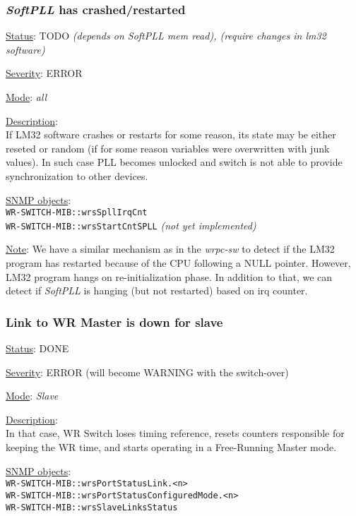 \subsubsection{\bf \emph{SoftPLL} has crashed/restarted}
		\label{fail:timing:spll_crash}
		\begin{packed_enum}
			\item [] \underline{Status}: TODO \emph{(depends on SoftPLL mem read), (require changes in lm32 software)}
			\item [] \underline{Severity}: ERROR
			\item [] \underline{Mode}: \emph{all}
			\item [] \underline{Description}:\\
				If LM32 software crashes or restarts for some reason, its state may be
				either reseted or random (if for some reason variables were overwritten
				with junk values). In such case PLL becomes unlocked and switch is not
				able to provide synchronization to other devices.
			\item [] \underline{SNMP objects}:\\
				\texttt{WR-SWITCH-MIB::wrsSpllIrqCnt}\\
				\texttt{WR-SWITCH-MIB::wrsStartCntSPLL} \emph{(not yet implemented)}
			\item [] \underline{Note}: We have a similar mechanism as in the
				\emph{wrpc-sw} to detect if the LM32 program has restarted because of
				the CPU following a NULL pointer. However, LM32 program hangs on
				re-initialization phase. 
				In addition to that, we can detect if
				\emph{SoftPLL} is hanging (but not restarted) based on irq counter.
		\end{packed_enum}

\subsubsection{\bf Link to WR Master is down for slave}
		\label{fail:timing:master_down}
		\begin{packed_enum}
			\item [] \underline{Status}: DONE
			\item [] \underline{Severity}: ERROR (will become WARNING with the
				switch-over)
			\item [] \underline{Mode}: \emph{Slave}
			\item [] \underline{Description}:\\
				In that case, WR Switch loses timing reference, resets counters
				responsible for keeping the WR time, and starts operating in a
				Free-Running Master mode.
			\item [] \underline{SNMP objects}:\\
				\texttt{WR-SWITCH-MIB::wrsPortStatusLink.<n>}\\
				\texttt{WR-SWITCH-MIB::wrsPortStatusConfiguredMode.<n>}\\
				\texttt{WR-SWITCH-MIB::wrsSlaveLinksStatus}
		\end{packed_enum}

